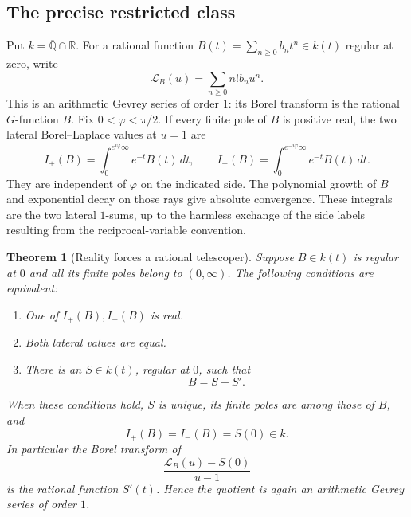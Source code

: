 \documentclass[11pt,a4paper]{article}
\newtheorem{theorem}{Theorem}[section]
\theoremstyle{definition}
\theoremstyle{remark}
\numberwithin{equation}{section}
\begin{document}
\subsection{The precise restricted class}
Put $k=\overline{\mathbb Q}\cap\mathbb R$. For a rational function
$B(t)=\sum_{n\ge0}b_nt^n\in k(t)$ regular at zero, write
\[
 \mathcal L_B(u)=\sum_{n\ge0}n!b_nu^n.
\]
This is an arithmetic Gevrey series of order $1$: its Borel
transform is the rational $G$-function $B$. Fix $0<\varphi<\pi/2$.
If every finite pole of $B$ is positive real, the two lateral
Borel--Laplace values at $u=1$ are
\[
 I_+(B)=\int_{0}^{e^{i\varphi}\infty}e^{-t}B(t)\,dt,
 \qquad
 I_-(B)=\int_{0}^{e^{-i\varphi}\infty}e^{-t}B(t)\,dt.
\]
They are independent of $\varphi$ on the indicated side.
The polynomial growth of $B$ and exponential decay on those rays
give absolute convergence. These integrals are the two lateral
$1$-sums, up to the harmless exchange of the side labels resulting
from the reciprocal-variable convention.

\begin{theorem}[Reality forces a rational telescoper]
\label{p8:sf:real-sum}
Suppose $B\in k(t)$ is regular at $0$ and all its finite poles
belong to $(0,\infty)$. The following conditions are equivalent:
\begin{enumerate}
\item One of $I_+(B),I_-(B)$ is real.
\item Both lateral values are equal.
\item There is an $S\in k(t)$, regular at $0$, such that
\begin{equation}\label{p8:sf:telescoper}
 B=S-S'.
\end{equation}
\end{enumerate}
When these conditions hold, $S$ is unique, its finite poles are
among those of $B$, and
\[
 I_+(B)=I_-(B)=S(0)\in k.
\]
In particular the Borel transform of
\begin{equation}\label{p8:sf:quotient}
 \frac{\mathcal L_B(u)-S(0)}{u-1}
\end{equation}
is the rational function $S'(t)$. Hence the quotient is again an
arithmetic Gevrey series of order $1$.
\end{theorem}
\end{document}
